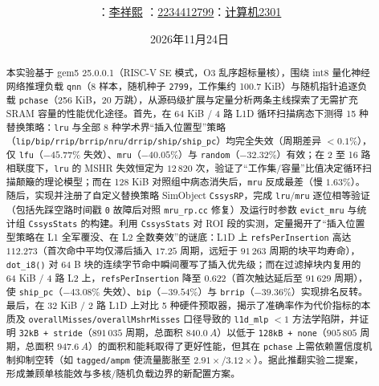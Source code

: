 \documentclass[12pt,a4paper,fontset=mac]{ctexart}
\title{\reporttitle\\[0.4em]\large\subtask}
\author{\small\authname：\underline{李祥熙}\quad
\authid：\underline{2234412799}\quad\class：\underline{计算机2301}}
\date{2026年11月24日}
\begin{document}
\maketitle

\begin{abstract}
本实验基于 gem5 25.0.0.1（RISC-V SE 模式，O3 乱序超标量核），围绕 int8 量化神经网络推理负载 \texttt{qnn}（8 样本，随机种子 \texttt{2799}，工作集约 100.7 KiB）与随机指针追逐负载 \texttt{pchase}（256 KiB，20 万跳），从源码级扩展与定量分析两条主线探索了无需扩充 SRAM 容量的性能优化途径。首先，在 64 KiB / 4 路 L1D 循环扫描病态下测得 15 种替换策略：\texttt{lru} 与全部 8 种学术界“插入位置型”策略（\texttt{lip/bip/rrip/brrip/nru/drrip/ship/ship\_pc}）均完全失效（周期差异 $<0.1\%$），仅 \texttt{lfu}（$-45.77\%$ 失效）、\texttt{mru}（$-40.05\%$）与 \texttt{random}（$-32.32\%$）有效；在 2 至 16 路相联度下，\texttt{lru} 的 MSHR 失效恒定为 $12\,820$ 次，验证了“工作集/容量”比值决定循环扫描颠簸的理论模型；而在 128 KiB 对照组中病态消失后，\texttt{mru} 反成最差（慢 $1.63\%$）。随后，实现并注册了自定义替换策略 SimObject \texttt{CssysRP}，完成 \texttt{lru}/\texttt{mru} 逐位相等验证（包括先踩空路时间戳 \texttt{0} 故障后对照 \texttt{mru\_rp.cc} 修复）及运行时参数 \texttt{evict\_mru} 与统计组 \texttt{CssysStats} 的构建。利用 \texttt{CssysStats} 对 ROI 段的实测，定量揭开了“插入位置型策略在 L1 全军覆没、在 L2 全数奏效”的谜底：L1D 上 \texttt{refsPerInsertion} 高达 $112.273$（首次命中平均仅滞后插入 $17.25$ 周期，远短于 $91\,263$ 周期的块平均寿命），\texttt{dot\_i8()} 对 64 B 块的连续字节命中瞬间覆写了插入优先级；而在过滤掉块内复用的 64 KiB / 4 路 L2 上，\texttt{refsPerInsertion} 降至 $0.622$（首次触达延后至 $91\,629$ 周期），使 \texttt{ship\_pc}（$-43.08\%$ 失效）、\texttt{bip}（$-39.54\%$）与 \texttt{brrip}（$-39.36\%$）实现排名反转。最后，在 32 KiB / 2 路 L1D 上对比 5 种硬件预取器，揭示了准确率作为代价指标的本质及 \texttt{overallMisses/overallMshrMisses} 口径导致的 \texttt{l1d\_mlp} $<1$ 方法学陷阱，并证明 \texttt{32kB + stride}（$891\,035$ 周期，总面积 $840.0\ A$）以低于 \texttt{128kB + none}（$905\,805$ 周期，总面积 $947.6\ A$）的面积和能耗取得了更好性能，但其在 \texttt{pchase} 上需依赖置信度机制抑制空转（如 \texttt{tagged/ampm} 使流量膨胀至 $2.91\times$/$3.12\times$）。据此推翻实验二提案，形成兼顾单核能效与多核/随机负载边界的新配置方案。
\end{abstract}

\clearpage
\tableofcontents
\newpage
\end{document}
